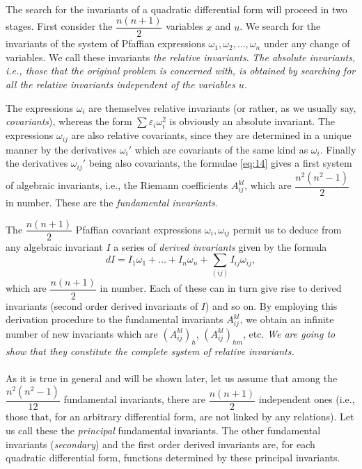 \documentclass[leqno,12pt]{article}
\makeatletter
\let\old@epsilon\epsilon
\let\old@varepsilon\varepsilon
\let\epsilon\old@varepsilon
\let\varepsilon\old@epsilon
\theoremstyle{shape1}
\theoremstyle{shape0}
\theoremstyle{shape2}
\theoremstyle{definition}
\makeatother
\begin{document}
\paragraph{}
\label{sec:14}
The search for the invariants of a quadratic differential form will proceed in two stages. First consider the $\dfrac{n(n+1)}{2}$ variables $x$ and $u$. We search for the invariants of the system of Pfaffian expressions $\omega_{1},\omega_{2},\dots,\omega_{n}$ under any change of variables. We call these invariants \emph{the relative invariants}. \emph{The absolute invariants, i.e., those that the original problem is concerned with, is obtained by searching for all the relative invariants independent of the variables $u$.}

The expressions $\omega_{i}$ are themselves relative invariants (or rather, as we usually say, \emph{covariants}), whereas the form $\sum\epsilon_{i}\omega_{i}^{2}$ is obviously an absolute invariant. The expressions $\omega_{ij}$ are also relative covariants, since they are determined in a unique manner by the derivatives $\omega_{i}'$ which are covariants of the same kind as $\omega_{i}$. Finally the derivatives $\omega_{ij}'$ being also covariants, the formulae \eqref{eq:14} gives a first system of algebraic invariants, i.e., the Riemann coefficients $A^{kl}_{ij}$, which are $\dfrac{n^{2}(n^{2}-1)}{2}$ in number. These are the \emph{fundamental invariants}.

The $\dfrac{n(n+1)}{2}$ Pfaffian covariant expressions $\omega_{i},\omega_{ij}$ permit us to deduce from any algebraic invariant $I$ a series of \emph{derived invariants} given by the formula
\[
dI=I_{1}\omega_{1}+\dots+I_{n}\omega_{n}+\sum_{(ij)}I_{ij}\omega_{ij},
\]
which are $\dfrac{n(n+1)}{2}$ in number. Each of these can in turn give rise to derived invariants (second order derived invariants of $I$) and so on. By employing this derivation procedure to the fundamental invariants $A^{kl}_{ij}$, we obtain an infinite number of new invariants which are $(A^{kl}_{ij})_{h}$, $(A^{kl}_{ij})_{hm}$, etc. \emph{We are going to show that they constitute the complete system of relative invariants.}


\paragraph{}
\label{sec:15}
As it is true in general and will be shown later, let us assume that among the $\dfrac{n^{2}(n^{2}-1)}{12}$ fundamental invariants, there are $\dfrac{n(n+1)}{2}$ independent ones (i.e., those that, for an arbitrary differential form, are not linked by any relations). Let us call these the \emph{principal} fundamental invariants. The other fundamental invariants (\emph{secondary}) and the first order derived invariants are, for each quadratic differential form, functions determined by these principal invariants.
\end{document}
